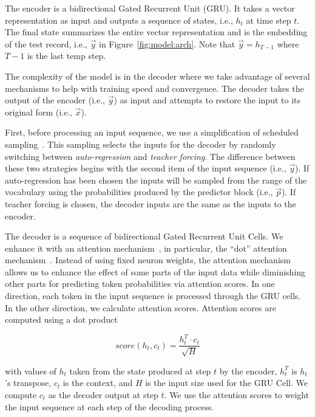 The encoder is a bidirectional Gated Recurrent Unit (GRU). It takes a vector
representation as input and outputs a sequence of states, i.e., $h_t$ at time
step $t$. The final state
summarizes the entire vector representation and is the embedding of the test
record, i.e., $\vec{y}$ in Figure~\ref{fig:model:arch}. Note that 
$\vec{y} = h_{T-1}$  where $T-1$ is the last temp step. 



The complexity of the model is in the decoder where we take advantage of
several mechanisms to help with training speed and convergence. The decoder
takes the output of the encoder (i.e., $\vec{y}$) as input and attempts to
restore the input to its original form (i.e., $\vec{x}$). 

First, before processing an input sequence, we use a simplification of
scheduled sampling~\cite{raff_inside_2021, mihaylova-martins-2019-scheduled}.
This sampling selects the inputs for the decoder by randomly switching
between \textit{auto-regression} and \textit{teacher forcing}. 
The difference between these two strategies
begins with the second item of the input sequence (i.e., $\vec{y}$). 
If auto-regression has been
chosen the inputs will be sampled from the range of the vocabulary using the
probabilities produced by the predictor block (i.e., $\vec{p}$).  If teacher
forcing is chosen, the decoder inputs are the same as the inputs to the
encoder. 

The decoder is a sequence of bidirectional Gated Recurrent Unit Cells. We enhance
it with an attention mechanism~\cite{niu2021review}, in particular, the ``dot'' 
attention mechanism~\cite{luong2015effective}. 
Instead of using fixed
neuron weights, the attention mechanism allows us to enhance the 
effect of some parts of the input data while diminishing other parts for predicting
token probabilities via attention scores. 
In one
direction, each token in the input sequence is processed through the GRU cells.
In the other direction, we calculate attention scores. Attention scores are
computed using a dot product~\cite{raff_inside_2021}

\begin{equation} \label{eq:attention}
score(h_t, c_t) = \frac{h_t^T \cdot c_t}{\sqrt{H}}
\end{equation}

\noindent with values of $h_t$ taken from the state produced at step $t$ by the
encoder, $h_t^T$ is $h_t$'s transpose, $c_t$ is the context, 
and $H$ is the
input size used for the GRU Cell. We compute $c_t$ as the decoder output at step $t$.
We use the attention scores to weight the input sequence at each step of the decoding process.


